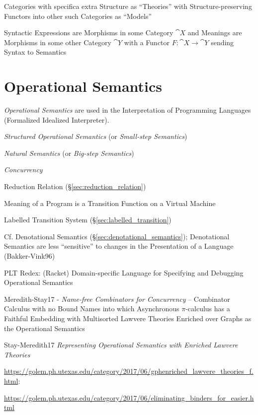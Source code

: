 Categories with specifica extra Structure as ``Theories'' with
Structure-preserving Functors into other such Categories as ``Models''

Syntactic Expressions are Morphisms in some Category $\cat{X}$ and
Meanings are Morphisms in some other Category $\cat{Y}$ with a Functor
$F : \cat{X} \rightarrow \cat{Y}$ sending Syntax to Semantics



\section{Operational Semantics}\label{sec:operational_semantics}

\emph{Operational Semantics} are used in the Interpretation of
Programming Languages (Formalized Idealized Interpreter).

\emph{Structured Operational Semantics} (or \emph{Small-step Semantics})

\emph{Natural Semantics} (or \emph{Big-step Semantics})

\emph{Concurrency}

Reduction Relation (\S\ref{sec:reduction_relation})

Meaning of a Program is a Transition Function on a Virtual Machine

Labelled Transition System (\S\ref{sec:labelled_transition})

\fist Cf. Denotational Semantics (\S\ref{sec:denotational_semantics});
Denotational Semantics are less ``sensitive'' to changes in the
Presentation of a Language (Bakker-Vink96) %

PLT Redex: (Racket) Domain-specific Language for Specifying and
Debugging Operational Semantics

Meredith-Stay17 - \emph{Name-free Combinators for Concurrency} --
Combinator Calculus with no Bound Names into which Asynchronous
$\pi$-calculus has a Faithful Embedding with Multisorted Lawvere
Theories Enriched over Graphs as the Operational Semantics

Stay-Meredith17 \emph{Representing Operational Semantics with Enriched
Lawvere Theories}

\url{https://golem.ph.utexas.edu/category/2017/06/gphenriched_lawvere_theories_f.html}:

\url{https://golem.ph.utexas.edu/category/2017/06/eliminating_binders_for_easier.html}

